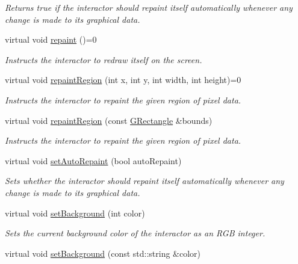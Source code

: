 \begin{DoxyCompactItemize}
\begin{DoxyCompactList}\small\item\em Returns true if the interactor should repaint itself automatically whenever any change is made to its graphical data. \end{DoxyCompactList}\item 
virtual void \mbox{\hyperlink{classGDrawingSurface_a4a8ae47b42f1e6a41b65d3546df46218}{repaint}} ()=0
\begin{DoxyCompactList}\small\item\em Instructs the interactor to redraw itself on the screen. \end{DoxyCompactList}\item 
virtual void \mbox{\hyperlink{classGDrawingSurface_a1a3898317080fecf8af21bbeaeeb37c3}{repaint\+Region}} (int x, int y, int width, int height)=0
\begin{DoxyCompactList}\small\item\em Instructs the interactor to repaint the given region of pixel data. \end{DoxyCompactList}\item 
virtual void \mbox{\hyperlink{classGDrawingSurface_a769c46fb3e1004aec76e8b0adfa42aa6}{repaint\+Region}} (const \mbox{\hyperlink{classGRectangle}{G\+Rectangle}} \&bounds)
\begin{DoxyCompactList}\small\item\em Instructs the interactor to repaint the given region of pixel data. \end{DoxyCompactList}\item 
virtual void \mbox{\hyperlink{classGDrawingSurface_adf10848319457bd6df4c657bf8872bee}{set\+Auto\+Repaint}} (bool auto\+Repaint)
\begin{DoxyCompactList}\small\item\em Sets whether the interactor should repaint itself automatically whenever any change is made to its graphical data. \end{DoxyCompactList}\item 
virtual void \mbox{\hyperlink{classGDrawingSurface_aba673fd56570a074aba10fa059524b96}{set\+Background}} (int color)
\begin{DoxyCompactList}\small\item\em Sets the current background color of the interactor as an R\+GB integer. \end{DoxyCompactList}\item 
virtual void \mbox{\hyperlink{classGDrawingSurface_ab4677ab2474e68b07aa56605af92a84a}{set\+Background}} (const std\+::string \&color)

\end{DoxyCompactItemize}
